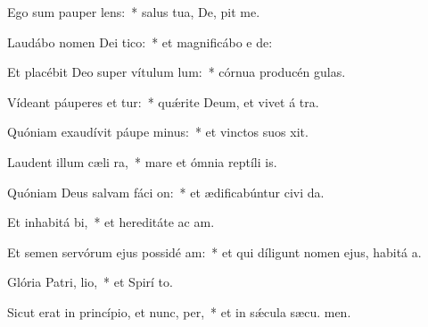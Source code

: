 \item Ego sum pauper  lens:~* salus tua, De, pit me.
\item Laudábo nomen Dei  tico:~* et magnificábo e  de:
\item Et placébit Deo super vítulum lum:~* córnua producén  gulas.
\item Vídeant páuperes et tur:~* quǽrite Deum, et vivet á tra.
\item Quóniam exaudívit páupe minus:~* et vinctos suos  xit.
\item Laudent illum cæli  ra,~* mare et ómnia reptíli  is.
\item Quóniam Deus salvam fáci on:~* et ædificabúntur civi da.
\item Et inhabitá bi,~* et hereditáte ac am.
\item Et semen servórum ejus possidé am:~* et qui díligunt nomen ejus, habitá  a.
\item Glória Patri,  lio,~* et Spirí to.
\item Sicut erat in princípio, et nunc,  per,~* et in sǽcula sæcu. men.
